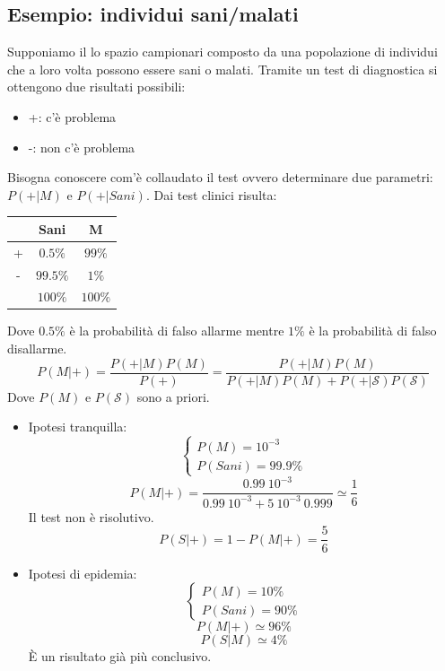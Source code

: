\documentclass[11pt,a4paper]{book}
\begin{document}
\subsection{Esempio: individui sani/malati}
Supponiamo il lo spazio campionari composto da una popolazione di individui che a loro volta possono essere sani o malati. Tramite un test di diagnostica si ottengono due risultati possibili:
\begin{itemize}
\item +: c'è problema
\item  -: non c'è problema
\end{itemize}
Bisogna conoscere com'è collaudato il test ovvero determinare due parametri: $ P(+|M) $ e $ P(+|\textit{Sani}) $. Dai test clinici risulta:
\begin{center}
\begin{tabular}{|c|c|c|}
\hline  & Sani & M \\ 
\hline + & $ 0.5\% $ & $ 99\%  $\\ 
\hline - & $ 99.5\% $ & $ 1\%  $ \\ 
\hline  & $ 100\% $ &$  100\%  $\\ 
\hline 
\end{tabular} 
\end{center}
Dove $ 0.5 \% $ è la probabilità di falso allarme mentre $ 1 \% $ è la probabilità di falso disallarme.
\begin{equation}
P(M|+) = \frac{P(+|M)P(M)}{P(+)} = \frac{P(+|M)P(M)}{P(+|M)P(M)+P(+|\mathcal{S})P(\mathcal{S})}
\end{equation}
Dove $ P(M) $ e $ P(\mathcal{S}) $ sono a priori.
\begin{itemize}
\item Ipotesi tranquilla:
\begin{equation}
\begin{cases}
P(M)= 10^{-3} \\
P(\textit{Sani}) = 99.9 \%
\end{cases}
\end{equation}
\begin{equation}
P(M|+) = \frac{0.99 \ 10^{-3}}{0.99 \ 10^{-3} + 5 \ 10^{-3} \ 0.999}\simeq\frac{1}{6}
\end{equation}
Il test non è risolutivo.
\begin{equation}
P(S|+) = 1 - P(M|+) = \frac{5}{6}
\end{equation}
\item Ipotesi di epidemia:
\begin{equation}
\begin{cases}
P(M)= 10 \% \\
P(\textit{Sani}) = 90 \%
\end{cases}
\end{equation}
\begin{equation}
P(M|+) \simeq 96 \%
\end{equation}
\begin{equation}
P(S|M)\simeq 4 \%
\end{equation}
\`{E} un risultato già più conclusivo.
\end{itemize}
\end{document}
